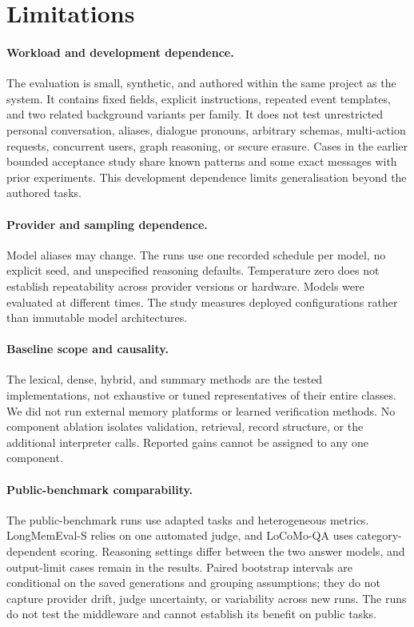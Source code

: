 \documentclass[11pt,a4paper]{article}
\begin{document}
\section{Limitations}
\paragraph{Workload and development dependence.}
The evaluation is small, synthetic, and authored within the same project as the system. It contains fixed fields, explicit instructions, repeated event templates, and two related background variants per family. It does not test unrestricted personal conversation, aliases, dialogue pronouns, arbitrary schemas, multi-action requests, concurrent users, graph reasoning, or secure erasure. Cases in the earlier bounded acceptance study share known patterns and some exact messages with prior experiments. This development dependence limits generalisation beyond the authored tasks.

\paragraph{Provider and sampling dependence.}
Model aliases may change. The runs use one recorded schedule per model, no explicit seed, and unspecified reasoning defaults. Temperature zero does not establish repeatability across provider versions or hardware. Models were evaluated at different times. The study measures deployed configurations rather than immutable model architectures.

\paragraph{Baseline scope and causality.}
The lexical, dense, hybrid, and summary methods are the tested implementations, not exhaustive or tuned representatives of their entire classes. We did not run external memory platforms or learned verification methods. No component ablation isolates validation, retrieval, record structure, or the additional interpreter calls. Reported gains cannot be assigned to any one component.

\paragraph{Public-benchmark comparability.}
The public-benchmark runs use adapted tasks and heterogeneous metrics. LongMemEval-S relies on one automated judge, and LoCoMo-QA uses category-dependent scoring. Reasoning settings differ between the two answer models, and output-limit cases remain in the results. Paired bootstrap intervals are conditional on the saved generations and grouping assumptions; they do not capture provider drift, judge uncertainty, or variability across new runs. The runs do not test the middleware and cannot establish its benefit on public tasks.
\end{document}
